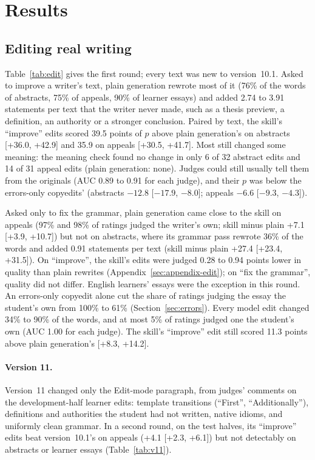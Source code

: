 \documentclass[11pt]{article}
\begin{document}
\section{Results}
\label{sec:results}

\subsection{Editing real writing}
\label{sec:edit}

Table~\ref{tab:edit} gives the first round; every text was new to version~10.1. Asked to improve a writer's text, plain generation rewrote most of it (76\% of the words of abstracts, 75\% of appeals, 90\% of learner essays) and added 2.74 to 3.91 statements per text that the writer never made, such as a thesis preview, a definition, an authority or a stronger conclusion. Paired by text, the skill's ``improve'' edits scored 39.5 points of $p$ above plain generation's on abstracts [+36.0, +42.9] and 35.9 on appeals [+30.5, +41.7]. Most still changed some meaning: the meaning check found no change in only 6 of 32 abstract edits and 14 of 31 appeal edits (plain generation: none). Judges could still usually tell them from the originals (AUC 0.89 to 0.91 for each judge), and their $p$ was below the errors-only copyedits' (abstracts $-12.8$ [$-17.9$, $-8.0$]; appeals $-6.6$ [$-9.3$, $-4.3$]).

Asked only to fix the grammar, plain generation came close to the skill on appeals (97\% and 98\% of ratings judged the writer's own; skill minus plain +7.1 [+3.9, +10.7]) but not on abstracts, where its grammar pass rewrote 36\% of the words and added 0.91 statements per text (skill minus plain +27.4 [+23.4, +31.5]). On ``improve'', the skill's edits were judged 0.28 to 0.94 points lower in quality than plain rewrites (Appendix~\ref{sec:appendix-edit}); on ``fix the grammar'', quality did not differ. English learners' essays were the exception in this round. An errors-only copyedit alone cut the share of ratings judging the essay the student's own from 100\% to 61\% (Section~\ref{sec:errors}). Every model edit changed 34\% to 90\% of the words, and at most 5\% of ratings judged one the student's own (AUC 1.00 for each judge). The skill's ``improve'' edit still scored 11.3 points above plain generation's [+8.3, +14.2].

\paragraph{Version 11.} Version~11 changed only the Edit-mode paragraph, from judges' comments on the development-half learner edits: template transitions (``First'', ``Additionally''), definitions and authorities the student had not written, native idioms, and uniformly clean grammar. In a second round, on the test halves, its ``improve'' edits beat version~10.1's on appeals (+4.1 [+2.3, +6.1]) but not detectably on abstracts or learner essays (Table~\ref{tab:v11}).
\end{document}
